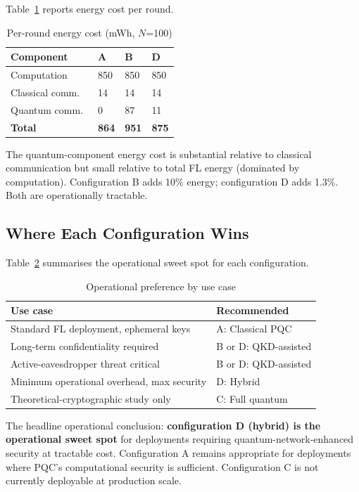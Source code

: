 \documentclass[sigconf,nonacm]{acmart}
\begin{document}
Table~\ref{tab:energy} reports energy cost per round.

\begin{table}[h]
\caption{Per-round energy cost (mWh, $N$=100)}
\label{tab:energy}
\small
\begin{tabularx}{\columnwidth}{@{}p{2.4cm}X X X@{}}
\toprule
\textbf{Component} & \textbf{A} & \textbf{B} & \textbf{D} \\
\midrule
Computation       & 850 & 850 & 850 \\
Classical comm.\  & 14  & 14  & 14 \\
Quantum comm.\    & 0   & 87  & 11 \\
\textbf{Total}    & \textbf{864} & \textbf{951} & \textbf{875} \\
\bottomrule
\end{tabularx}
\end{table}

The quantum-component energy cost is substantial relative to
classical communication but small relative to total FL energy
(dominated by computation). Configuration B adds 10\% energy;
configuration D adds 1.3\%. Both are operationally tractable.

\subsection{Where Each Configuration Wins}

Table~\ref{tab:winners} summarises the operational sweet spot
for each configuration.

\begin{table}[h]
\caption{Operational preference by use case}
\label{tab:winners}
\small
\begin{tabularx}{\columnwidth}{@{}p{2.6cm}X@{}}
\toprule
\textbf{Use case} & \textbf{Recommended} \\
\midrule
Standard FL deployment, ephemeral keys & A: Classical PQC \\
Long-term confidentiality required     & B or D: QKD-assisted \\
Active-eavesdropper threat critical    & B or D: QKD-assisted \\
Minimum operational overhead, max security & D: Hybrid \\
Theoretical-cryptographic study only   & C: Full quantum \\
\bottomrule
\end{tabularx}
\end{table}

The headline operational conclusion: \textbf{configuration D
(hybrid) is the operational sweet spot} for deployments requiring
quantum-network-enhanced security at tractable cost. Configuration
A remains appropriate for deployments where PQC's computational
security is sufficient. Configuration C is not currently
deployable at production scale.
\end{document}
